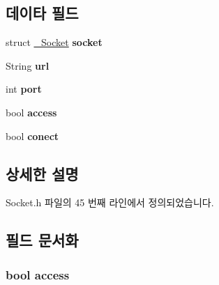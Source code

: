 \subsection*{데이타 필드}
\begin{DoxyCompactItemize}
\item 
\hypertarget{struct_socket_extends_a6d8ff51667f3038e4e0974b8dfcb8b59}{struct \hyperlink{struct___socket}{\-\_\-\-Socket} {\bfseries socket}}\label{struct_socket_extends_a6d8ff51667f3038e4e0974b8dfcb8b59}

\item 
\hypertarget{struct_socket_extends_a983d3a00cb7e2cdac046d6ef1ce9f8f2}{String {\bfseries url}}\label{struct_socket_extends_a983d3a00cb7e2cdac046d6ef1ce9f8f2}

\item 
\hypertarget{struct_socket_extends_a63c89c04d1feae07ca35558055155ffb}{int {\bfseries port}}\label{struct_socket_extends_a63c89c04d1feae07ca35558055155ffb}

\item 
\hypertarget{struct_socket_extends_ab4e2372937bb1eec89f2a954a4db6604}{bool {\bfseries access}}\label{struct_socket_extends_ab4e2372937bb1eec89f2a954a4db6604}

\item 
\hypertarget{struct_socket_extends_a506634736b4585cbeac7cbdefec1e540}{bool {\bfseries conect}}\label{struct_socket_extends_a506634736b4585cbeac7cbdefec1e540}

\end{DoxyCompactItemize}


\subsection{상세한 설명}


Socket.\-h 파일의 45 번째 라인에서 정의되었습니다.



\subsection{필드 문서화}
\hypertarget{struct_socket_extends_ab4e2372937bb1eec89f2a954a4db6604}{
\subsubsection[{access}]{\setlength{\rightskip}{0pt plus 5cm}bool access}}\label{struct_socket_extends_ab4e2372937bb1eec89f2a954a4db6604}


